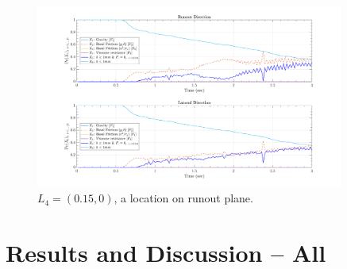 \documentclass{article}
\begin{document}
\begin{figure}[H]
\centering
	\includegraphics[width=0.9\textwidth]{InclinedPlane/LocalRecords/DominancePr_x4V.png}
	\caption{$L_4=(0.15,0)$, a location on runout plane.}
	\label{fig:Ramp-Prx4V}
\end{figure}

\section{Results and Discussion -- All}

\newpage


\end{document}
